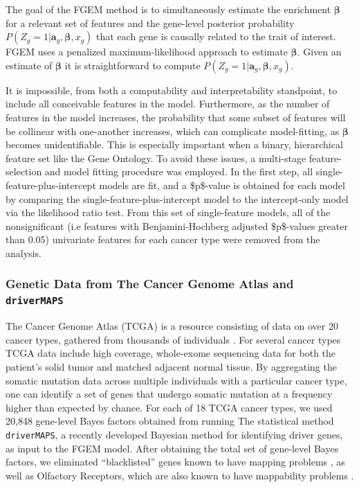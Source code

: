 The goal of the FGEM method is to simultaneously estimate the enrichment $\boldsymbol{\beta}$ for a relevant set of features and the gene-level posterior probability \(P(Z_g=1|\textbf{a}_g,\boldsymbol{\beta},x_g)\) that each
gene is causally related to the trait of interest.  FGEM uses a penalized maximum-likelihood approach to estimate $\boldsymbol{\beta}$.  Given an estimate of $\boldsymbol{\beta}$ it is straightforward to compute
\(P(Z_g=1|\textbf{a}_g,\boldsymbol{\beta},x_g)\).

It is impossible, from both a computability and interpretability standpoint, to include all conceivable features in the model.
Furthermore, as the number of features in the model increases, the probability that some subset of features will be collinear with one-another increases,
which can complicate model-fitting, as \(\boldsymbol{\beta}\) becomes unidentifiable. This is especially important when a binary, hierarchical feature set
like the Gene Ontology.  To avoid these issues, a multi-stage feature-selection and model fitting procedure was employed. In the first step, all
single-feature-plus-intercept models are fit, and a \$p\$-value is obtained for each model by comparing the single-feature-plus-intercept model to the intercept-only model via the
likelihood ratio test.  From this set of single-feature models, all of the nonsignificant (i.e features with Benjamini-Hochberg adjusted
\$p\$-values greater than 0.05) univariate features for each cancer type were removed from the analysis.


\subsubsection{Genetic Data from The Cancer Genome Atlas and \texttt{driverMAPS}}\label{sec:org31ff9f1}

The Cancer Genome Atlas (TCGA) is a resource consisting of data on over 20 cancer types, gathered from thousands of individuals \cite{TCGA}.  For several cancer types TCGA data include high coverage, whole-exome sequencing data for both the patient's solid tumor and matched adjacent normal tissue. By aggregating the somatic mutation data across multiple individuals with a particular cancer type, one can identify a set of genes that undergo somatic mutation at a frequency higher than expected by chance.  For each of 18 TCGA cancer types, we used 20,848 gene-level Bayes factors obtained from running The statistical method \texttt{driverMAPS}, a recently developed Bayesian method for identifying driver genes, as input to the FGEM model.  After obtaining the total set of gene-level Bayes factors, we eliminated ``blacklisted'' genes known to have mapping problems \cite{drivermapsblacklist}, as well as Olfactory Receptors, which are also known to have mappability problems \cite{Derrien_2012}.

